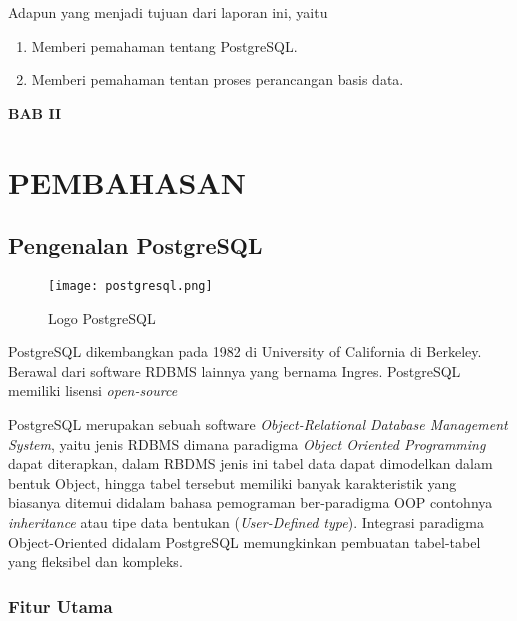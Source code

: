 \documentclass[12pt,a4paper]{article}
\begin{document}
Adapun yang menjadi tujuan dari laporan ini, yaitu

\begin{enumerate}
  \item Memberi pemahaman tentang PostgreSQL.
  \item Memberi pemahaman tentan proses perancangan basis data.
\end{enumerate}

\newpage


\begin{center}

  \large{\textbf{BAB II}}

  \section*{PEMBAHASAN}

\end{center}


\subsection{Pengenalan PostgreSQL}

\begin{figure}[h]
  \centering
  \texttt{[image: postgresql.png]}
  \caption{\small{Logo PostgreSQL}}
\end{figure}

\cite{postgresdoc} PostgreSQL dikembangkan pada 1982 di University of California di Berkeley. Berawal dari 
software RDBMS lainnya yang bernama Ingres. PostgreSQL memiliki lisensi \emph{open-source}

\cite{postgresdoc} PostgreSQL merupakan sebuah software \emph{Object-Relational Database Management System}, yaitu
jenis RDBMS dimana paradigma \emph{Object Oriented Programming} dapat diterapkan, dalam
RBDMS jenis ini tabel data dapat dimodelkan dalam bentuk Object, hingga tabel
tersebut memiliki banyak karakteristik yang biasanya ditemui didalam bahasa
pemograman ber-paradigma OOP contohnya \emph{inheritance} atau tipe data 
bentukan (\emph{User-Defined type}). Integrasi paradigma Object-Oriented didalam PostgreSQL 
memungkinkan pembuatan tabel-tabel yang fleksibel dan kompleks.

\subsubsection{Fitur Utama}
\end{document}
